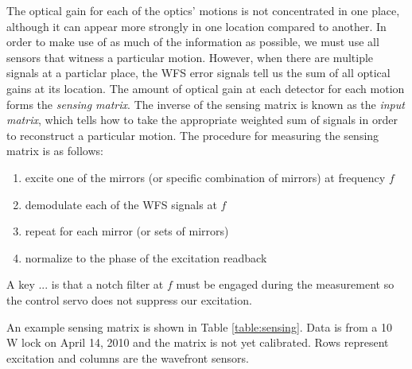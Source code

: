 The optical gain for each of the optics' motions is not concentrated
in one place, although it can appear more strongly in one location
compared to another. In order to make use of as much of the
information as possible, we must use all sensors that witness a
particular motion. However, when there are multiple signals at a
particlar place, the WFS error signals tell us the sum of all optical
gains at its location. The amount of optical gain at each detector for
each motion forms the \emph{sensing matrix}. The inverse of the
sensing matrix is known as the \emph{input matrix}, which tells how to
take the appropriate weighted sum of signals in order to reconstruct a
particular motion. The procedure for measuring the sensing matrix is
as follows:
\begin{enumerate}
\item excite one of the mirrors (or specific combination of mirrors)
  at frequency $f$ \vspace{-10pt}
\item demodulate each of the WFS signals at $f$ \vspace{-10pt}
\item repeat for each mirror (or sets of mirrors) \vspace{-10pt}
\item normalize to the phase of the excitation readback
\end{enumerate}
A key ... is that a notch filter at $f$ must be engaged during the
measurement so the control servo does not suppress our excitation.

An example sensing matrix is shown in Table \ref{table:sensing}. Data
is from a 10 W lock on April 14, 2010 and the matrix is not yet
calibrated. Rows represent excitation and columns are the wavefront
sensors.

